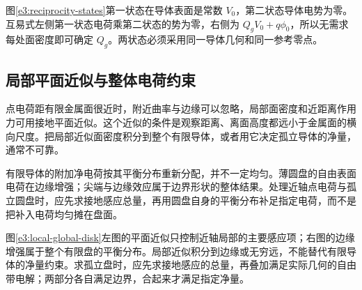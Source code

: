图\ref{e3:reciprocity-states}第一状态在导体表面是常数 $V_0$，第二状态导体电势为零。互易式左侧第一状态电荷乘第二状态的势为零，右侧为 $Q_gV_0+q\phi_0$，所以无需求每处面密度即可确定 $Q_g$。两状态必须采用同一导体几何和同一参考零点。

\subsection{局部平面近似与整体电荷约束}

点电荷距有限金属面很近时，附近曲率与边缘可以忽略，局部面密度和近距离作用力可用接地平面近似。这个近似的条件是观察距离、离面高度都远小于金属面的横向尺度。把局部近似面密度积分到整个有限导体，或者用它决定孤立导体的净量，通常不可靠。

有限导体的附加净电荷按其平衡分布重新分配，并不一定均匀。薄圆盘的自由表面电荷在边缘增强；尖端与边缘效应属于边界形状的整体结果。处理近轴点电荷与孤立圆盘时，应先求接地感应总量，再用圆盘自身的平衡分布补足指定电荷，而不是把补入电荷均匀摊在盘面。


图\ref{e3:local-global-disk}左图的平面近似只控制近轴局部的主要感应项；右图的边缘增强属于整个有限盘的平衡分布。局部近似积分到边缘或无穷远，不能替代有限导体的净量约束。求孤立盘时，应先求接地感应的总量，再叠加满足实际几何的自由带电解；两部分各自满足边界，合起来才满足指定净量。
